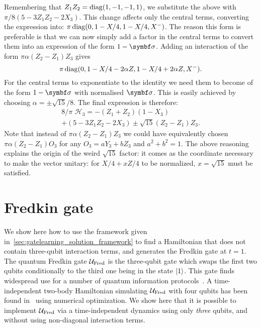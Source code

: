 Remembering that $Z_1 Z_2 = \operatorname{diag}(1, -1, -1, 1)$, we substitute the above with
$\pi/8(5 - 3Z_1 Z_2 - 2X_3)$.
This change affects only the central terms, converting the expression into:
$\pi \operatorname{diag}(0, 1 - X/4, 1 - X/4, X^-)$.
The reason this form is preferable is that we can now simply add a factor in the central terms to convert them into an expression of the form $1 - \bs\sigma$.
Adding an interaction of the form $\pi \alpha (Z_2 - Z_1)Z_3$ gives
\begin{equation}
	\pi\operatorname{diag}(0, 1 - X/4 - 2\alpha Z, 1 - X/4 + 2\alpha Z, X^-).
\end{equation}
For the central terms to exponentiate to the identity we need them to become of the form $1-\bs\sigma$ with normalised $\bs\sigma$.
This is easily achieved by choosing $\alpha=\pm\sqrt{15}/8$.
The final expression is therefore:
\begin{equation}
\begin{aligned}
	8/\pi \,\, \mathcal H_3 = -(Z_1 + Z_2)(1 - X_3) \\+ (5 - 3Z_1Z_2 - 2 X_3)
				 \pm \sqrt{15} (Z_2 - Z_1)Z_3.
\end{aligned}
\end{equation}
Note that instead of $\pi \alpha (Z_2 - Z_1)Z_3$ we could have equivalently chosen
$\pi\alpha(Z_2-Z_1)O_3$ for any $O_3 = a Y_3 + b Z_3$ and $a^2 + b^2 = 1$.
The above reasoning explains the origin of the weird $\sqrt{15}$ factor: it comes as the coordinate necessary to make the vector unitary: for $X/4 + x Z / 4$ to be normalized, $x = \sqrt{15}$ must be satisfied.

\section{Fredkin gate}
\label{sec:gatelearning_fredkin}

We show here how to use the framework given in~\cref{sec:gatelearning_solution_framework} to find a Hamiltonian that does not contain three-qubit interaction terms, and generates the Fredkin gate at $t=1$.
The quantum Fredkin gate ${\mathcal{U}}_{\operatorname{Fred}}$ is the three-qubit gate which swaps the first two qubits conditionally to the third one being in the state $\ket1$.
This gate finds widespread use for a number of quantum information protocols~\cite{patel2016quantum,loft2018quantum}.
A time-independent two-body Hamiltonian simulating ${\mathcal{U}}_{\operatorname{Fred}}$ with four qubits has been found in~\cite{banchi2016quantum} using numerical optimization.
We show here that it is possible to implement ${\mathcal{U}}_{\operatorname{Fred}}$ via a time-independent dynamics using only \textit{three} qubits, and without using non-diagonal interaction terms.

